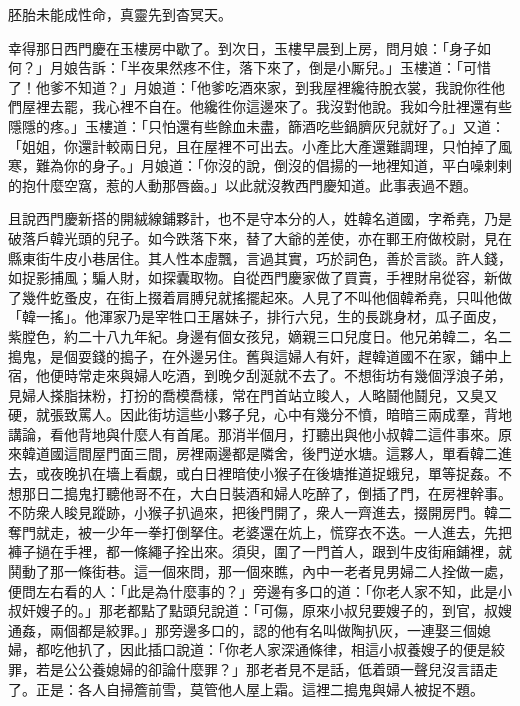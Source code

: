 \begin{myquote} 
胚胎未能成性命，真靈先到杳冥天。
\end{myquote} 

幸得那日西門慶在玉樓房中歇了。到次日，玉樓早晨到上房，問月娘：「身子如何？」月娘告訴：「半夜果然疼不住，落下來了，倒是小厮兒。」玉樓道：「可惜了！他爹不知道？」月娘道：「他爹吃酒來家，到我屋裡纔待脫衣裳，我說你徃他們屋裡去罷，我心裡不自在。他纔徃你這邊來了。我沒對他說。我如今肚裡還有些隱隱的疼。」玉樓道：「只怕還有些餘血未盡，篩酒吃些鍋臍灰兒就好了。」又道：「姐姐，你還計較兩日兒，且在屋裡不可出去。小產比大產還難調理，只怕掉了風寒，難為你的身子。」月娘道：「你沒的說，倒沒的倡揚的一地裡知道，平白噪剌剌的抱什麼空窩，惹的人動那唇齒。」{}以此就沒教西門慶知道。此事表過不題。

且說西門慶新搭的開絨線鋪夥計，也不是守本分的人，姓韓名道國，字希堯，乃是破落戶韓光頭的兒子。如今跌落下來，替了大爺的差使，亦在鄆王府做校尉，見在縣東街牛皮小巷居住。其人性本虛飄，言過其實，巧於詞色，善於言談。許人錢，如捉影捕風；騙人財，如探囊取物。自從西門慶家做了買賣，手裡財帛從容，新做了幾件虼蚤皮，在街上掇着肩膊兒就搖擺起來。人見了不叫他個韓希堯，只叫他做「韓一搖」。他渾家乃是宰牲口王屠妹子，排行六兒，生的長跳身材，瓜子面皮，紫膛色，約二十八九年紀。身邊有個女孩兒，嫡親三口兒度日。他兄弟韓二，名二搗鬼，是個耍錢的搗子，在外邊另住。舊與這婦人有奸，趕韓道國不在家，鋪中上宿，他便時常走來與婦人吃酒，到晚夕刮涎就不去了。不想街坊有幾個浮浪子弟，見婦人搽脂抹粉，打扮的喬模喬樣，常在門首站立睃人，人略鬪他鬪兒，又臭又硬，就張致罵人。因此街坊這些小夥子兒，心中有幾分不憤，暗暗三兩成羣，背地講論，看他背地與什麼人有首尾。那消半個月，打聽出與他小叔韓二這件事來。原來韓道國這間屋門面三間，房裡兩邊都是隣舍，後門逆水塘。這夥人，單看韓二進去，或夜晚扒在墻上看覷，或白日裡暗使小猴子在後塘推道捉蛾兒，單等捉姦。不想那日二搗鬼打聽他哥不在，大白日裝酒和婦人吃醉了，倒插了門，在房裡幹事。不防衆人睃見蹤跡，小猴子扒過來，把後門開了，衆人一齊進去，掇開房門。韓二奪門就走，被一少年一拳打倒拏住。老婆還在炕上，慌穿衣不迭。一人進去，先把褲子撾在手裡，都一條繩子拴出來。{}須臾，圍了一門首人，跟到牛皮街廂鋪裡，就鬨動了那一條街巷。這一個來問，那一個來瞧，內中一老者見男婦二人拴做一處，便問左右看的人：「此是為什麼事的？」旁邊有多口的道：「你老人家不知，此是小叔奸嫂子的。」那老都點了點頭兒說道：「可傷，原來小叔兒要嫂子的，到官，叔嫂通姦，兩個都是絞罪。」那旁邊多口的，認的他有名叫做陶扒灰，一連娶三個媳婦，都吃他扒了，因此插口說道：「你老人家深通條律，相這小叔養嫂子的便是絞罪，若是公公養媳婦的卻論什麼罪？」那老者見不是話，低着頭一聲兒沒言語走了。{}正是：各人自掃簷前雪，莫管他人屋上霜。這裡二搗鬼與婦人被捉不題。

